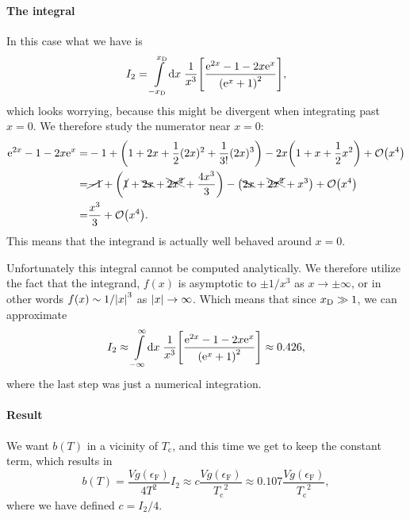 \documentclass[11pt,letter, swedish, english
]{article}
\newcommand{\Tc}{\ensuremath{T_{\text{c}}}}
\newcommand{\eF}{\ensuremath{\epsilon_{\text{F}}}}
\begin{document}
\paragraph{The integral}
In this case what we have is 
\begin{equation}
I_2=\int_{-\xD}^{\xD}\!\rd{x}\;
\frac{1}{x^3}
\qty[
\frac{\ee^{2x}-1-2x\ee^{x}}{\qty(\ee^{x}+1)^2}
],
\end{equation}
which looks worrying, because this might be divergent when integrating
past $x=0$. 
We therefore study the numerator near $x=0$:
\begin{equation}
\begin{aligned}
\ee^{2x}-1-2x\ee^{x}=&-1 + \qty(1+2x+\frac{1}{2}(2x)^2+\frac{1}{3!}(2x)^3)
-2x\qty(1+x +\frac{1}{2}x^2) +\order{x^4}\\
=&\cancel{-1}+\qty(\cancel{1}+\bcancel{2x}+\xcancel{2x^2}+\frac{4x^3}{3})
-\qty(\bcancel{2x}+\xcancel{2x^2} +x^3) +\order{x^4}\\
=&\frac{x^3}{3}+\order{x^4}.
\end{aligned}
\end{equation}
This means that the integrand is actually well behaved around $x=0$.


Unfortunately this integral cannot be computed analytically. We
therefore utilize the fact that the integrand, $f(x)$ is asymptotic to
$\pm1/x^3$ as $x\to\pm\infty$, or in other words $f(x)\sim1/\abs{x}^3$ as
$\abs{x}\to\infty$. Which means that since $x_{\text{D}}\gg1$, we can
approximate
\begin{equation}
I_2\approx\int_{-\infty}^{\infty}\!\rd{x}\;
\frac{1}{x^3}
\qty[\frac{\ee^{2x}-1-2x\ee^{x}}{\qty(\ee^{x}+1)^2}]
\approx 0.426,
\end{equation}
where the last step was just a numerical integration.

\paragraph{Result}
We want $b(T)$ in a vicinity of $\Tc$, and this time we get to keep
the constant term, which results in
\begin{equation}\label{eq:2_b}
b(T)=\frac{Vg(\eF)}{4T^2}I_2
\approx c\frac{Vg(\eF)}{\Tc^2}\approx 0.107\frac{Vg(\eF)}{\Tc^2},
\end{equation}
where we have defined $c=I_2/4$.
\end{document}
